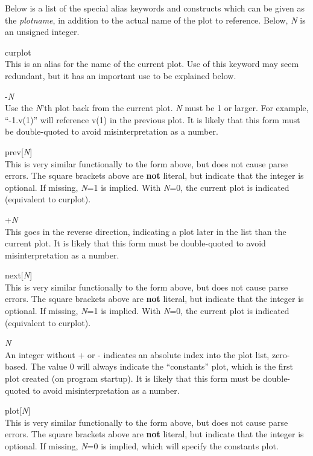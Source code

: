Below is a list of the special alias keywords and constructs which can
be given as the {\it plotname}, in addition to the actual name of the
plot to reference.  Below, {\it N} is an unsigned integer.

\begin{description}
\item{\vt curplot}\\
This is an alias for the name of the current plot.  Use of this
keyword may seem redundant, but it has an important use to be
explained below.

\item{\vt -}{\it N}\\
Use the {\it N\/}'th plot back from the current plot.  {\it N} must be
1 or larger.  For example, ``{\vt -1.v(1)}'' will reference {\vt v(1)}
in the previous plot.  It is likely that this form must be
double-quoted to avoid misinterpretation as a number.

\item{\vt prev}[{\it N\/}]\\
This is very similar functionally to the form above, but does not
cause parse errors.  The square brackets above are {\bf not} literal,
but indicate that the integer is optional.  If missing, {\it N\/}=1 is
implied.  With {\it N\/}=0, the current plot is indicated (equivalent
to {\vt curplot}).

\item{\vt +}{\it N}\\
This goes in the reverse direction, indicating a plot later in the
list than the current plot.  It is likely that this form must be
double-quoted to avoid misinterpretation as a number.

\item{\vt next}[{\it N\/}]\\
This is very similar functionally to the form above, but does not
cause parse errors.  The square brackets above are {\bf not} literal,
but indicate that the integer is optional.  If missing, {\it N\/}=1 is
implied.  With {\it N\/}=0, the current plot is indicated (equivalent
to {\vt curplot}).

\item{\it N}\\
An integer without {\vt +} or {\vt -} indicates an absolute index into
the plot list, zero-based.  The value 0 will always indicate the
``constants'' plot, which is the first plot created (on program
startup).  It is likely that this form must be double-quoted to avoid
misinterpretation as a number.

\item{\vt plot}[{\it N\/}]\\
This is very similar functionally to the form above, but does not
cause parse errors.  The square brackets above are {\bf not} literal,
but indicate that the integer is optional.  If missing, {\it N\/}=0 is
implied, which will specify the {\vt constants} plot.
\end{description}

